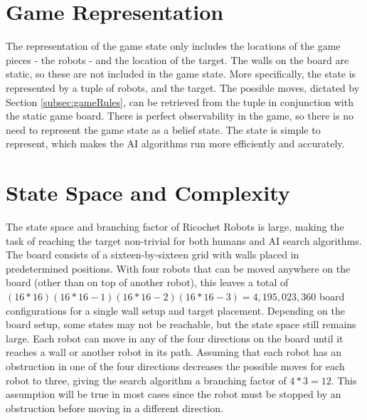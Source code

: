 \documentclass[a4paper,10pt]{article}
\begin{document}


\section{Game Representation}
\label{sec:gameRep}
The representation of the game state only includes the locations of the game pieces - the robots - and the location of the target. The walls on the board are static,
so these are not included in the game state. More specifically, the state is represented by a tuple of robots, and the target. The possible moves, dictated by Section
\ref{subsec:gameRules}, can be retrieved from the tuple in conjunction with the static game board. There is perfect observability in the game, so there is no need to represent
the game state as a belief state. The state is simple to represent, which makes the AI algorithms run more efficiently and accurately.


\section{State Space and Complexity}
\label{sec:stateSpace}
The state space and branching factor of Ricochet Robots is large, making the task of reaching the target non-trivial for both humans and AI search algorithms.
The board consists of a sixteen-by-sixteen grid with walls placed in predetermined positions.  With four robots that can be moved anywhere on the board (other
than on top of another robot), this leaves a total of $(16*16)(16*16-1)(16*16-2)(16*16-3) = 4,195,023,360$ board configurations for a single wall setup and
target placement.  Depending on the board setup, some states may not be reachable, but the state space still remains large. Each robot can move in any of the
four directions on the board until it reaches a wall or another robot in its path.  Assuming that each robot has an obstruction in one of the four directions
decreases the possible moves for each robot to three, giving the search algorithm a branching factor of $4*3 = 12$.  This assumption will be true in most cases since
the robot must be stopped by an obstruction before moving in a different direction. \\
\end{document}
